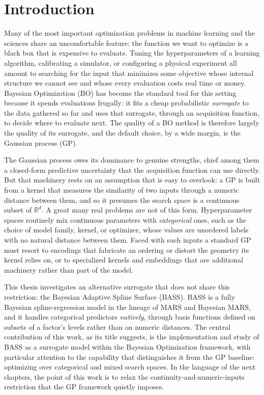 \chapter*{Introduction}

Many of the most important optimization problems in machine learning and the
sciences share an uncomfortable feature: the function we want to optimize is a
black box that is expensive to evaluate. Tuning the hyperparameters of a learning
algorithm, calibrating a simulator, or configuring a physical experiment all
amount to searching for the input that minimizes some objective whose internal
structure we cannot see and whose every evaluation costs real time or money.
Bayesian Optimization (BO) has become the standard tool for this setting because
it spends evaluations frugally: it fits a cheap probabilistic \emph{surrogate}
to the data gathered so far and uses that surrogate, through an acquisition
function, to decide where to evaluate next. The quality of a BO method is
therefore largely the quality of its surrogate, and the default choice, by a wide
margin, is the Gaussian process (GP).

The Gaussian process owes its dominance to genuine strengths, chief among them a
closed-form predictive uncertainty that the acquisition function can use directly.
But that machinery rests on an assumption that is easy to overlook: a GP is built
from a kernel that measures the similarity of two inputs through a numeric
distance between them, and so it presumes the search space is a continuous subset
of $\mathbb{R}^d$. A great many real problems are not of this form. Hyperparameter
spaces routinely mix continuous parameters with \emph{categorical} ones, such as
the choice of model family, kernel, or optimizer, whose values are unordered
labels with no natural distance between them. Faced with such inputs a standard GP
must resort to encodings that fabricate an ordering or distort the geometry its
kernel relies on, or to specialized kernels and embeddings that are additional
machinery rather than part of the model.

This thesis investigates an alternative surrogate that does not share this
restriction: the Bayesian Adaptive Spline Surface (BASS). BASS is a fully Bayesian
spline-regression model in the lineage of MARS and Bayesian MARS, and it handles
categorical predictors \emph{natively}, through basis functions defined on subsets
of a factor's levels rather than on numeric distances. The central contribution of
this work, as its title suggests, is the implementation and study of BASS as a
surrogate model within the Bayesian Optimization framework, with particular
attention to the capability that distinguishes it from the GP baseline: optimizing
over categorical and mixed search spaces. In the language of the next chapters,
the point of this work is to relax the continuity-and-numeric-inputs restriction
that the GP framework quietly imposes.

